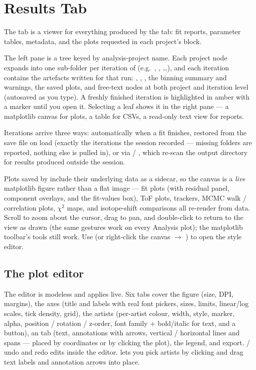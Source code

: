 \section{Results Tab}
\label{sec:results}

The  tab is a viewer for everything produced by the
 tab: fit reports, parameter tables, metadata, and the
plots requested in each project's  block.

The left pane is a tree
keyed by analysis-project name. Each project node expands into one
sub-folder per iteration of  (e.g.\ ,
, \dots), and each iteration contains the artefacts
written for that run: , ,
, the binning summary and warnings, the saved plots,
and free-text  nodes at both project and iteration level
(autosaved as you type). A freshly finished iteration is highlighted
in amber with a  marker until you open it. Selecting a
leaf shows it in the right pane --- a matplotlib canvas for plots, a
table for CSVs, a read-only text view for reports.

Iterations arrive three ways: automatically when a fit finishes,
restored from the save file on load (exactly the iterations the
session recorded --- missing folders are reported, nothing else is
pulled in), or via  / , which
re-scan the output directory for results produced outside the
session.

Plots saved by \denis{} include their underlying data as a
 sidecar, so the canvas is a \emph{live} matplotlib
figure rather than a flat image --- fit plots (with residual panel,
component overlays, and the fit-values box), ToF plots, trackers,
MCMC walk / correlation plots, $\chi^2$ maps, and isotope-shift
comparisons all re-render from data. Scroll to zoom about the cursor,
drag to pan, and double-click to return to the view as drawn (the same
gestures work on every Analysis plot); the matplotlib toolbar's tools
still work. Use  (or right-click the canvas
$\rightarrow$ ) to open the style editor.

\subsection{The plot editor}

The editor is modeless and applies live. Six tabs cover the figure
(size, DPI, margins), the axes (title and labels with real font
pickers, sizes, limits, linear/log scales, tick density, grid), the
artists (per-artist colour, width, style, marker, alpha, position /
rotation / z-order, font family + bold/italic for text, and a
 button), an  tab (text, annotations
with arrows, vertical / horizontal lines and spans --- placed by
coordinates or by clicking the plot), the legend, and export.
 /  undo and redo edits inside the editor.
 lets you pick artists by
clicking and drag text labels and annotation arrows into place.

